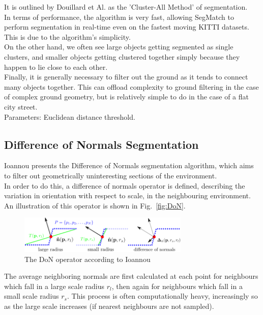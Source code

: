 It is outlined by Douillard et Al. \cite{douillard2011segmentation} as the 'Cluster-All Method' of segmentation.\\

In terms of performance, the algorithm is very fast, allowing SegMatch to perform segmentation in real-time even on the fastest moving KITTI \cite{KITTI} datasets. This is due to the algorithm's simplicity.\\

On the other hand, we often see large objects getting segmented as single clusters, and smaller objects getting clustered together simply because they happen to lie close to each other.\\

Finally, it is generally necessary to filter out the ground as it tends to connect many objects together. This can offload complexity to ground filtering in the case of complex ground geometry, but is relatively simple to do in the case of a flat city street.\\

Parameters: Euclidean distance threshold.

\subsection{Difference of Normals Segmentation}
\label{subsec:DoN}

Ioannou \cite{ioannou2012difference} presents the Difference of Normals segmentation algorithm, which aims to filter out geometrically uninteresting sections of the environment.\\

In order to do this, a difference of normals operator is defined, describing the variation in orientation with respect to scale, in the neighbouring environment. An illustration of this operator is shown in Fig.~\ref{fig:DoN}.\\

\begin{figure}
  \centering
  \includegraphics[width=3.2in]{images/DoN.png}
  \caption{The DoN operator according to Ioannou \cite{ioannou2012difference}}
  \label{fig:hierarchical}
\end{figure}

The average neighboring normals are first calculated at each point for neighbours which fall in a large scale radius $r_l$, then again for neighbours which fall in a small scale radius $r_s$. This process is often computationally heavy, increasingly so as the large scale increases (if nearest neighbours are not sampled).\\

